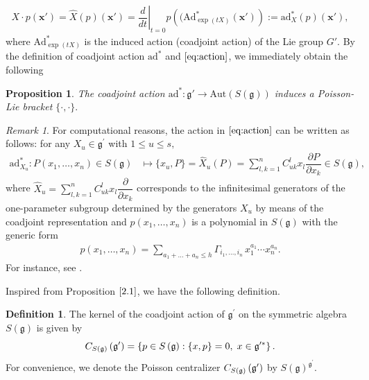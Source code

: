 \documentclass[10pt]{amsart}
\newtheorem{proposition}[theorem]{Proposition}
\theoremstyle{definition}
\newtheorem{definition}[theorem]{Definition}
\theoremstyle{corollary}
\theoremstyle{remark}
\newtheorem{remark}[theorem]{Remark}
\theoremstyle{conclusion}
\begin{document}
 \begin{align}
   X \cdot p (\boldsymbol{x}')=   \hat{X}(p)(\boldsymbol{x}') = \left.\dfrac{d}{dt} \right|_{t = 0} p\left((\mathrm{Ad}_{\exp(tX)}^*(\boldsymbol{x}')\right) := \mathrm{ad}_X^*  (p) (\boldsymbol{x}'), \label{eq:action}
 \end{align} where $\mathrm{Ad}_{\exp(tX)}^*$ is the induced action (coadjoint action) of the Lie group $G'$. By the definition of coadjoint action $\mathrm{ad}^*$ and $\eqref{eq:action}$, we immediately obtain the following  

 \begin{proposition}
 \label{2.1}
     The coadjoint action $\mathrm{ad}^* : \mathfrak{g}' \rightarrow \mathrm{Aut} \left(S(\mathfrak{g})\right)$ induces a Poisson-Lie bracket $\{\cdot,\cdot\}.$  
 \end{proposition}
 \begin{remark}
     For computational reasons, the action in $\eqref{eq:action}$ can be written   as follows: for any $X_u \in \mathfrak{g}^\prime$ with $1 \leq u \leq s,$ \begin{align}
   \mathrm{ad}_{X_u}^*:     P(x_1,\ldots,x_n) \in S(\mathfrak{g}) & \mapsto \{x_u,P  \} = \hat{X}_u(P ) = \sum_{l,k=1}^n C_{uk}^lx_l \dfrac{\partial P}{\partial x_k} \in S(\mathfrak{g}), \label{eq:dual}
  \end{align} where $\hat{X}_u = \sum_{l,k=1}^n C_{uk}^l x_l \dfrac{\partial}{\partial x_k}$ corresponds to the infinitesimal generators of the one-parameter subgroup determined by the generators $X_u$ by means of the coadjoint representation and $p(x_1,\ldots,x_n)$ is a polynomial in $S(\mathfrak{g})$ with the generic form 
  \begin{align}
    p(x_1,\ldots,x_n) = \sum_{a_1 + \ldots + a_n   \leq h}  \Gamma_{i_1,\ldots,i_n}\, x_1^{a_1} \cdots x_n^{a_n} . \label{eq:ci}
\end{align}  
For instance, see \cite{gtp,MR0760556}.
 \end{remark}

  Inspired from Proposition $\ref{2.1}$, we have the following definition.    


\begin{definition}
\label{2.3} 
The kernel of the coadjoint action of $\mathfrak{g}^\prime$ on the  symmetric algebra $S(\mathfrak{g})$ is given by \begin{equation*}
	C_{S(\frak{g})}\left( \frak{g}^{\prime}\right) =\left\{ p\in S\left( 
	\frak{g}\right) :\left\{x ,p\right\} =0,\; x\in \frak{g}^{\prime *}\right\} .
\end{equation*} For  convenience, we denote the Poisson centralizer  $C_{S(\frak{g})}\left( \frak{g}^{\prime}\right)$ by $S(\mathfrak{g})^{\mathfrak{g}^\prime}.$
 \end{definition}
\end{document}
